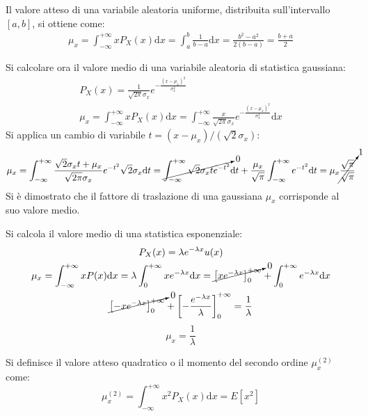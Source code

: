 \documentclass{article}
\newcommand{\df}{\mathrm{d}}
\numberwithin{equation}{subsection}
\begin{document}
Il valore atteso di una variabile aleatoria uniforme, distribuita sull'intervallo $[a,b]$, si ottiene come:
\begin{gather}
    \mu_x=\displaystyle\int_{-\infty}^{+\infty}xP_X(x)\df x=\int_{a}^b\frac{1}{b-a}\df x=\frac{b^2-a^2}{2(b-a)}=\frac{b+a}{2}
\end{gather}


Si calcolare ora il valore medio di una variabile aleatoria di statistica gaussiana:
\begin{gather*}
    P_X(x)=\displaystyle\frac{1}{\sqrt{2\pi}\sigma_x}e^{-\frac{(x-\mu_x)^2}{\sigma_x^2}}\\
    \mu_x=\displaystyle\int_{-\infty}^{+\infty}xP_X(x)\df x=\int_{-\infty}^{+\infty}\frac{x}{\sqrt{2\pi}\sigma_x}e^{-\frac{(x-\mu_x)^2}{\sigma_x^2}}\df x
\end{gather*}
Si applica un cambio di variabile $t=(x-\mu_x)/(\sqrt{2}\sigma_x)$:
\begin{gather*}
    \mu_x=\displaystyle\int_{-\infty}^{+\infty}\frac{\sqrt{2}\sigma_xt+\mu_x}{\sqrt{2\pi}\sigma_x}e^{-t^2}\sqrt{2}\sigma_x\df t=\cancelto{0}{\int_{-\infty}^{+\infty}\sqrt{2}\sigma_xte^{-t^2}}\df t+\frac{\mu_x}{\sqrt{\pi}}\int_{-\infty}^{+\infty}e^{-t^2}\df t=\mu_x\cancelto{1}{\frac{\sqrt{\pi}}{\sqrt{\pi}}}
\end{gather*}
Si è dimostrato che il fattore di traslazione di una gaussiana $\mu_x$ corrisponde al suo valore medio. 


Si calcola il valore medio di una statistica esponenziale:
\begin{gather*}
    P_X(x)=\lambda e^{-\lambda x}u(x)\\
    \mu_x=\displaystyle\int_{-\infty}^{+\infty}xP(x)\df x=\lambda\int_{0}^{+\infty}xe^{-\lambda x}\df x=\cancelto{0}{\left[xe^{-\lambda x}\right]_0^{+\infty}}+\int_0^{+\infty}e^{-\lambda x}\df x\\
    \displaystyle\cancelto{0}{\left[-xe^{-\lambda x}\right]_0^{+\infty}}+\left[-\frac{e^{-\lambda x}}{\lambda}\right]_0^{+\infty}=\frac{1}{\lambda}
\end{gather*}
\begin{equation}
    \mu_x=\displaystyle\frac{1}{\lambda}
\end{equation}

Si definisce il valore atteso quadratico o il momento del secondo ordine $\mu_x^{(2)}$ come:
\begin{equation}
    \mu_x^{(2)}=\displaystyle\int_{-\infty}^{+\infty}x^2P_X(x)\df x=E[x^2]
\end{equation}
\end{document}
